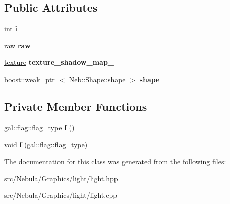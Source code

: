 \subsection*{\-Public \-Attributes}
\begin{DoxyCompactItemize}
\item 
\hypertarget{classNeb_1_1light_1_1light_a1d90e423f84e2ce61861e4e7d667a0fa}{int {\bfseries i\-\_\-}}\label{classNeb_1_1light_1_1light_a1d90e423f84e2ce61861e4e7d667a0fa}

\item 
\hypertarget{classNeb_1_1light_1_1light_ae5ddfcfae0bd6b994c5ec97d7211eeb6}{\hyperlink{classNeb_1_1light_1_1raw}{raw} {\bfseries raw\-\_\-}}\label{classNeb_1_1light_1_1light_ae5ddfcfae0bd6b994c5ec97d7211eeb6}

\item 
\hypertarget{classNeb_1_1light_1_1light_a1f0369556edb6b3211ac555d7b92c0cb}{\hyperlink{classNeb_1_1texture}{texture} {\bfseries texture\-\_\-shadow\-\_\-map\-\_\-}}\label{classNeb_1_1light_1_1light_a1f0369556edb6b3211ac555d7b92c0cb}

\item 
\hypertarget{classNeb_1_1light_1_1light_a09cd2a9721596c5ec98f5bd3d20aa1f6}{boost\-::weak\-\_\-ptr\*
$<$ \hyperlink{classNeb_1_1Shape_1_1shape}{\-Neb\-::\-Shape\-::shape} $>$ {\bfseries shape\-\_\-}}\label{classNeb_1_1light_1_1light_a09cd2a9721596c5ec98f5bd3d20aa1f6}

\end{DoxyCompactItemize}
\subsection*{\-Private \-Member \-Functions}
\begin{DoxyCompactItemize}
\item 
\hypertarget{classNeb_1_1light_1_1light_a77c268feb4c6c59c67bf4cbf898f1efa}{gal\-::flag\-::flag\-\_\-type {\bfseries f} ()}\label{classNeb_1_1light_1_1light_a77c268feb4c6c59c67bf4cbf898f1efa}

\item 
\hypertarget{classNeb_1_1light_1_1light_ad826b8ef7ed54e86d26c3a051ead30ff}{void {\bfseries f} (gal\-::flag\-::flag\-\_\-type)}\label{classNeb_1_1light_1_1light_ad826b8ef7ed54e86d26c3a051ead30ff}

\end{DoxyCompactItemize}


\-The documentation for this class was generated from the following files\-:\begin{DoxyCompactItemize}
\item 
src/\-Nebula/\-Graphics/light/light.\-hpp\item 
src/\-Nebula/\-Graphics/light/light.\-cpp\end{DoxyCompactItemize}

